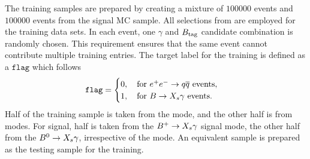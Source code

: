 The training samples are prepared by creating a mixture of $100 000$ \epem\ra\qqbar events and $100 000$ \BtoXsgamma events from the signal MC sample.
All selections from  are employed for the training data sets.
In each event, one $\gamma$ and $B_{\mathrm{tag}}$ candidate combination is randomly chosen.
This requirement ensures that the same event cannot contribute multiple training entries.
The target label for the training is defined as a $\mathtt{flag}$ which follows
\begin{equation}
    \mathtt{flag}=\begin{cases}
      0,\quad \mathrm{for}~\epem\ra\qqbar~\mathrm{events},\\ 
      1,\quad \mathrm{for}~\BtoXsgamma~\mathrm{events}.
      \end{cases}
\end{equation}
Half of the \epem\ra\qqbar training sample is taken from the \feiBp mode, and the other half is from \feiBz modes. 
For signal, half is taken from the $\BptoXsgamma$ signal mode, the other half from the $\BztoXsgamma$, irrespective of the \FEI mode.
An equivalent sample is prepared as the testing sample for the training.

